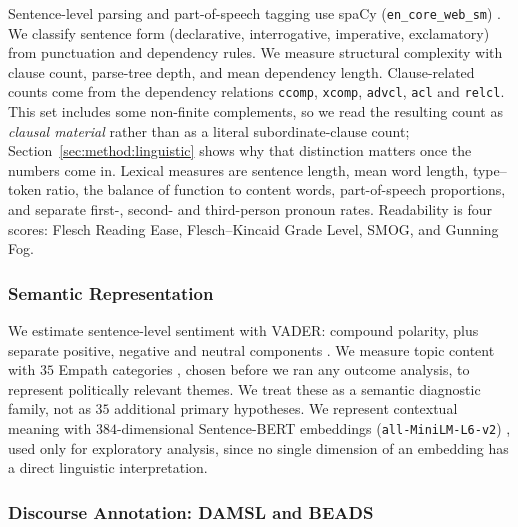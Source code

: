 \documentclass[pdflatex,sn-mathphys-num]{sn-jnl}%
\begin{document}
Sentence-level parsing and part-of-speech tagging use spaCy
(\texttt{en\_core\_web\_sm}) \cite{honnibal2020spacy}. We classify sentence
form (declarative, interrogative, imperative, exclamatory) from punctuation
and dependency rules. We measure structural complexity with clause count,
parse-tree depth, and mean dependency length. Clause-related counts come
from the dependency relations \texttt{ccomp}, \texttt{xcomp},
\texttt{advcl}, \texttt{acl} and \texttt{relcl}. This set includes some
non-finite complements, so we read the resulting count as \emph{clausal
material} rather than as a literal subordinate-clause count;
Section~\ref{sec:method:linguistic} shows why that distinction matters once
the numbers come in. Lexical measures are sentence length, mean word
length, type--token ratio, the balance of function to content words,
part-of-speech proportions, and separate first-, second- and third-person
pronoun rates. Readability is four scores: Flesch Reading Ease,
Flesch--Kincaid Grade Level, SMOG, and Gunning Fog.

\subsubsection{Semantic Representation}
\label{sec:method:semantic-rep}

We estimate sentence-level sentiment with VADER: compound polarity, plus
separate positive, negative and neutral components \cite{hutto2014vader}.
We measure topic content with $35$ Empath categories \cite{fast2016empath},
chosen before we ran any outcome analysis, to represent politically
relevant themes. We treat these as a semantic diagnostic family, not as
$35$ additional primary hypotheses. We represent contextual meaning with
$384$-dimensional Sentence-BERT embeddings (\texttt{all-MiniLM-L6-v2})
\cite{reimers2019sbert}, used only for exploratory analysis, since no
single dimension of an embedding has a direct linguistic interpretation.

\subsubsection{Discourse Annotation: DAMSL and BEADS}
\label{sec:method:discourse-rep}
\end{document}
